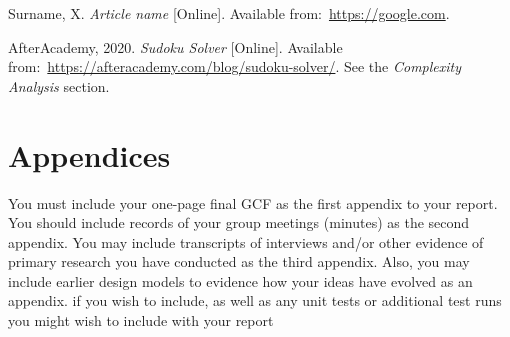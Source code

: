 \documentclass[12pt]{article}
\begin{document}
\renewcommand{\refname}{} 
\vspace{-20pt}
\begin{thebibliography}{99}
     Surname, X. \textit{Article name} [Online].
    Available from:~\url{https://google.com}.

     AfterAcademy, 2020. \textit{Sudoku Solver} [Online].
    Available from:~\url{https://afteracademy.com/blog/sudoku-solver/}. See the
    \textit{Complexity Analysis} section.
\end{thebibliography}


\section{Appendices}
You must include your one-page final GCF as the first appendix to your report. You should
include records of your group meetings (minutes) as the second appendix. You may include
transcripts of interviews and/or other evidence of primary research you have conducted as
the third appendix.
Also, you may include earlier design models to evidence how your ideas have evolved as an
appendix. if you wish to include, as well as any unit tests or additional test runs you might
wish to include with your report
\end{document}
